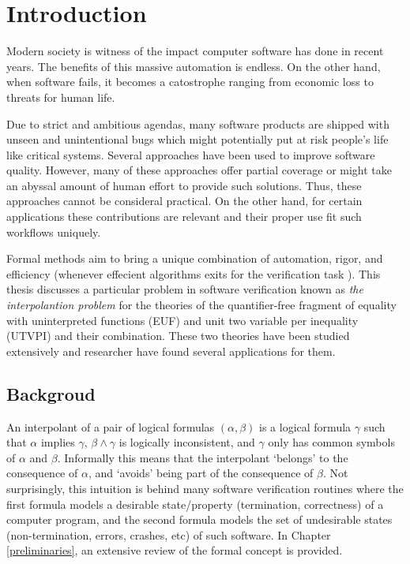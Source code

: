 \chapter{Introduction}

Modern society is witness of the impact computer software 
has done in recent years. The benefits of this massive 
automation is endless. On the other hand, when software 
fails, it becomes a catostrophe ranging from economic loss
to threats for human life. 

Due to strict and ambitious agendas, many software products
are shipped with unseen and unintentional bugs which might potentially put
at risk people's life like critical systems. Several approaches have been 
used to improve software quality. However, many of these approaches 
offer partial coverage or might take an abyssal amount of human effort to 
provide such solutions. Thus, these approaches cannot be consideral practical. 
On the other hand, for certain applications these contributions are relevant
and their proper use fit such workflows uniquely.

Formal methods aim to bring a unique combination of automation, rigor, and 
efficiency (whenever effecient algorithms exits for the verification task
). This thesis discusses a particular problem in software verification
known as \emph{the interpolantion problem} for the theories of the quantifier-free
fragment of equality with uninterpreted functions (EUF) and unit two variable per
inequality (UTVPI) and their combination. These two theories have been 
studied extensively and researcher have found several applications for them. 

\section{Backgroud}

An interpolant of a pair of logical formulas $(\alpha, \beta)$ 
is a logical formula $\gamma$
such that $\alpha$ implies $\gamma$, $\beta \land \gamma$ is logically
inconsistent, and $\gamma$ only has common symbols of $\alpha$ and $\beta$.
Informally this means that the 
interpolant `belongs' to the consequence of $\alpha$, 
and `avoids' being part of the consequence of $\beta$. 
Not surprisingly, this intuition is behind many software verification 
routines where the first formula models a desirable state/property
(termination, correctness) of a computer program, and the second 
formula models the set of undesirable states (non-termination, 
errors, crashes, etc) of such software. In Chapter 
\ref{preliminaries}, an extensive review of the formal concept 
is provided.

